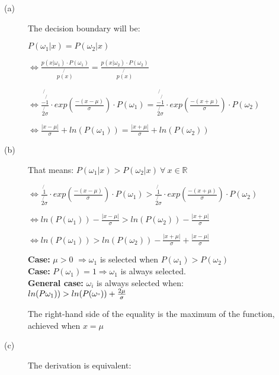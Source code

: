 \documentclass{article}
\begin{document}
\begin{description}

\item[(a)]
The decision boundary will be:

$P(\omega_1|x) = P (\omega_2|x)$

$\Leftrightarrow \frac{p(x|\omega_1)\cdot P(\omega_1)}{\not{p(x)}} = \frac{p(x|\omega_2) \cdot P(\omega_2)}{\not{p(x)}}$

$\Leftrightarrow \frac{\not{-\not{1}}}{\not{2 \sigma}}\cdot exp(\frac{-(x-\mu)}{\sigma}) \cdot P(\omega_1) = \frac{\not{-\not{1}}}{\not{2 \sigma}}\cdot exp(\frac{-(x+\mu)}{\sigma}) \cdot P(\omega_2)$

$\Leftrightarrow \frac{|x-\mu|}{\sigma} + ln(P(\omega_1)) = \frac{|x+\mu|}{\sigma} + ln (P(\omega_2))$


\item[(b)]
That means: 
$P(\omega_1|x) > P(\omega_2|x)\ \forall \ x \in \mathbb{R}$

$\Leftrightarrow \frac{\not{1}}{\not{2 \sigma}}\cdot exp(\frac{-(x-\mu)}{\sigma}) \cdot P(\omega_1) > \frac{\not{1}}{\not{2 \sigma}}\cdot exp(\frac{-(x+\mu)}{\sigma}) \cdot P(\omega_2)$

$\Leftrightarrow ln(P(\omega_1)) - \frac{|x-\mu|}{\sigma} > ln(P(\omega_2)) - \frac{|x+\mu|}{\sigma}$

$\Leftrightarrow ln(P(\omega_1)) > ln(P(\omega_2)) - \frac{|x+\mu|}{\sigma} + \frac{|x-\mu|}{\sigma}$

\vspace{0.3cm} 

\textbf{Case:} $\mu > 0$ $\Rightarrow \omega_1$ is selected when $P(\omega_1) > P(\omega_2)$\\

\textbf{Case:} $P(\omega_1) = 1 \Rightarrow \omega_1$ is always selected. \\

\textbf{General case:} $\omega_i$ is always selected when: \\
$ln(P\omega_1)) > ln(P(\omega_")) + \frac{2 \mu}{\sigma}$

The right-hand side of the equality is the maximum of the function, achieved when $x = \mu$

\item[(c)]
The derivation is equivalent:

\end{description}
\end{document}
